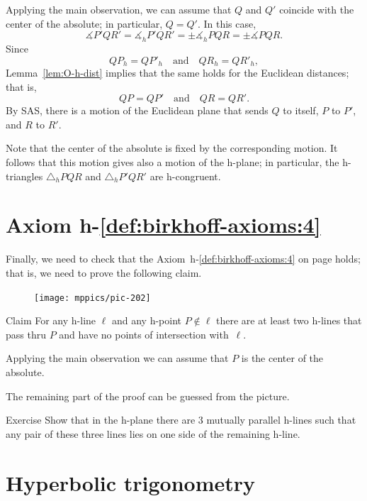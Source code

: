 Applying the main observation, 
we can assume that $Q$ and $Q'$ coincide with the center of the absolute; in particular, $Q=Q'$.
In this case, 
$$\measuredangle P' Q R'=\measuredangle_h P' Q R'=\pm\measuredangle_h P Q R=\pm\measuredangle P Q R.$$
Since 
$$Q P_h=Q P'_h\quad \text{and}\quad Q R_h=Q R'_h,$$
Lemma~\ref{lem:O-h-dist} implies that the same holds for the Euclidean distances;
that is,
$$Q P=Q P'
\quad
\text{and}
\quad
Q R=Q R'.$$
By SAS,
there is a motion of the Euclidean plane that sends
$Q$ to itself,
$P$ to $P'$, 
and $R$ to $R'$.

Note that the center of the absolute is fixed by the corresponding motion.
It follows that this motion gives also a motion of the h-plane;
in particular, the h-triangles 
$\triangle_h P Q R$ and $\triangle_h P' Q R'$ are h-congruent.
\qeds

\section*{Axiom h-$\!$\ref{def:birkhoff-axioms:4}}


Finally, we need to check that the Axiom~h-$\!$\ref{def:birkhoff-axioms:4} on page \pageref{def:hyperbolic-4a} holds;
that is, we need to prove the following claim.

{

\begin{figure}
\vskip-0mm
\centering
\texttt{[image: mppics/pic-202]}
\end{figure}

\begin{thm}{Claim}
For any h-line $\ell$ and any h-point $P\notin\ell$ there are at least two h-lines that pass thru $P$ 
and have no points of intersection with~$\ell$.
\end{thm}

Applying the main observation we can assume that $P$ is the center of the absolute.

The remaining part of the proof can be guessed from the picture.
\qeds

}

\begin{thm}{Exercise}\label{ex:3-h-lines}
Show that in the h-plane 
there are 3 mutually parallel h-lines 
such that any pair of these three lines lies on one side of the remaining h-line.
\end{thm}
 
\section*{Hyperbolic trigonometry}

